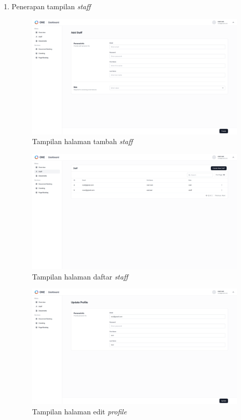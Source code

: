 \begin{enumerate}[label=\alph*)., leftmargin=1\parindent]
	\item{Penerapan tampilan \textit{staff}}
	
	
	\begin{figure}[H]
		\centering
		\includegraphics[keepaspectratio, width=13cm]{gambar/view_staff_add.png}
		\caption{Tampilan halaman tambah \textit{staff}}
		\label{gambar:view_staff_add.png}
	\end{figure}
	
	
	
	\begin{figure}[H]
		\centering
		\includegraphics[keepaspectratio, width=13cm]{gambar/view_staff_list.png}
		\caption{Tampilan halaman daftar \textit{staff}}
		\label{gambar:view_staff_list.png}
	\end{figure}
	
	
	
	\begin{figure}[H]
		\centering
		\includegraphics[keepaspectratio, width=13cm]{gambar/view_staff_edit.png}
		\caption{Tampilan halaman edit \textit{profile}}
		\label{gambar:view_staff_edit.png}
	\end{figure}
	

\end{enumerate}
